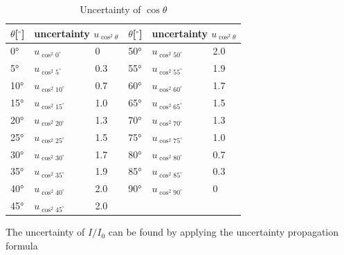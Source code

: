 \documentclass[12pt, a4paper]{article}
\begin{document}
\begin{table}[H]
	\centering
	\begin{tabular}{|l|ll|l|ll|}
	\hline
	$\theta${[}$^{\circ}${]} & \multicolumn{2}{c|}{uncertainty $u_{\cos^2\theta}$} & $\theta${[}$^{\circ}${]} & \multicolumn{2}{c|}{uncertainty $u_{\cos^2\theta}$} \\ \hline
	0°           			 & \multicolumn{1}{l|}{$u_{\cos^2 0^{\circ}}$} 	   & 0     & 50°          & \multicolumn{1}{l|}{$u_{\cos^2 50^{\circ}}$}    & 2.0   \\ \hline
	5°           			 & \multicolumn{1}{l|}{$u_{\cos^2 5^{\circ}}$}     & 0.3   & 55°          & \multicolumn{1}{l|}{$u_{\cos^2 55^{\circ}}$}    & 1.9   \\ \hline
	10°          			 & \multicolumn{1}{l|}{$u_{\cos^2 10^{\circ}}$}    & 0.7   & 60°          & \multicolumn{1}{l|}{$u_{\cos^2 60^{\circ}}$}    & 1.7   \\ \hline
	15°          			 & \multicolumn{1}{l|}{$u_{\cos^2 15^{\circ}}$}    & 1.0   & 65°          & \multicolumn{1}{l|}{$u_{\cos^2 65^{\circ}}$}    & 1.5   \\ \hline
	20°          			 & \multicolumn{1}{l|}{$u_{\cos^2 20^{\circ}}$}    & 1.3   & 70°          & \multicolumn{1}{l|}{$u_{\cos^2 70^{\circ}}$}    & 1.3   \\ \hline
	25°          			 & \multicolumn{1}{l|}{$u_{\cos^2 25^{\circ}}$}    & 1.5   & 75°          & \multicolumn{1}{l|}{$u_{\cos^2 75^{\circ}}$}    & 1.0   \\ \hline
	30°          			 & \multicolumn{1}{l|}{$u_{\cos^2 30^{\circ}}$}    & 1.7   & 80°          & \multicolumn{1}{l|}{$u_{\cos^2 80^{\circ}}$}    & 0.7   \\ \hline
	35°          			 & \multicolumn{1}{l|}{$u_{\cos^2 35^{\circ}}$}    & 1.9   & 85°          & \multicolumn{1}{l|}{$u_{\cos^2 85^{\circ}}$}    & 0.3   \\ \hline
	40°          			 & \multicolumn{1}{l|}{$u_{\cos^2 40^{\circ}}$}    & 2.0   & 90°          & \multicolumn{1}{l|}{$u_{\cos^2 90^{\circ}}$}    & 0     \\ \hline
	45°          			 & \multicolumn{1}{l|}{$u_{\cos^2 45^{\circ}}$}    & 2.0   &              & \multicolumn{1}{l|}{}    &       \\ \hline
	\end{tabular}
	\caption{Uncertainty of $\cos\theta$}
	\label{tab-1}
\end{table}

The uncertainty of $I/I_0$ can be found by applying the uncertainty propagation formula
\end{document}
